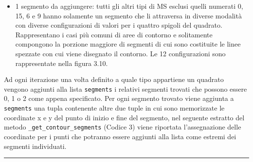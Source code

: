 \documentclass[12pt,a4paper]{report}
\begin{document}
\begin{itemize}
\item 1 segmento da aggiungere: tutti gli altri tipi di MS esclusi quelli numerati 0, 15, 6 e 9 hanno solamente un segmento che li attraversa in diverse modalità con diverse configurazioni di valori per i quattro spigoli del quadrato.  Rappresentano i casi più comuni di aree di contorno e   solitamente compongono la porzione maggiore di segmenti di cui sono costituite le linee spezzate con cui viene disegnato il contorno. Le 12 configurazioni sono rappresentate nella figura 3.10.
\begin{figure}[H]
\centering
\begin{floatrow}[1]
\end{floatrow}
\end{figure}

\end{itemize}
Ad ogni iterazione una volta definito a quale tipo appartiene un quadrato vengono aggiunti alla lista \verb|segments| i relativi segmenti trovati che possono essere 0, 1 o 2 come appena specificato.  Per ogni segmento trovato viene aggiunta a  \verb|segments| una tupla contenente altre due tuple in cui sono memorizzate le coordinate x e y del punto di inizio e fine del segmento, nel seguente estratto del metodo  \verb|_get_contour_segments| (Codice 3) viene riportata l'assegnazione delle coordinate per i punti che potranno essere aggiunti alla lista come estremi dei segmenti individuati.\newpage
\noindent\rule[0.5ex]{\linewidth}{2pt}
\end{document}
